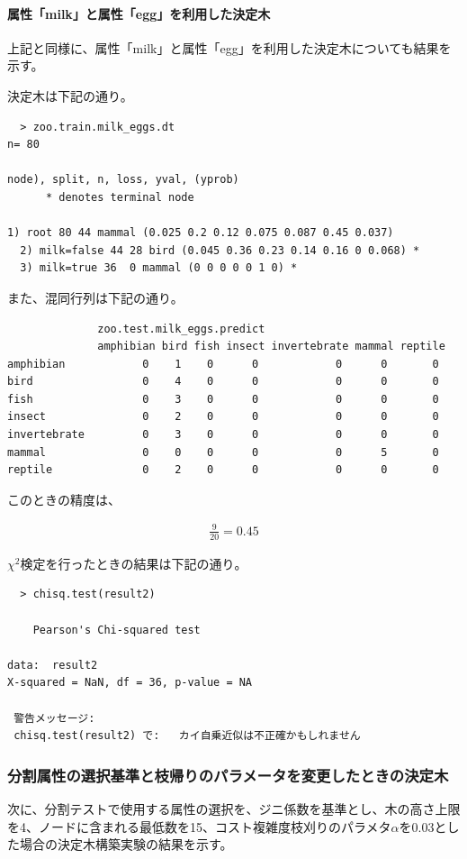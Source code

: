 \documentclass[dvipdfmx]{jsarticle}
\begin{document}
\paragraph{属性「milk」と属性「egg」を利用した決定木}\par
上記と同様に、属性「milk」と属性「egg」を利用した決定木についても結果を示す。\par
決定木は下記の通り。
\begin{verbatim}
  > zoo.train.milk_eggs.dt
n= 80

node), split, n, loss, yval, (yprob)
      * denotes terminal node

1) root 80 44 mammal (0.025 0.2 0.12 0.075 0.087 0.45 0.037)
  2) milk=false 44 28 bird (0.045 0.36 0.23 0.14 0.16 0 0.068) *
  3) milk=true 36  0 mammal (0 0 0 0 0 1 0) *
\end{verbatim}
また、混同行列は下記の通り。
\begin{verbatim}
              zoo.test.milk_eggs.predict
              amphibian bird fish insect invertebrate mammal reptile
amphibian            0    1    0      0            0      0       0
bird                 0    4    0      0            0      0       0
fish                 0    3    0      0            0      0       0
insect               0    2    0      0            0      0       0
invertebrate         0    3    0      0            0      0       0
mammal               0    0    0      0            0      5       0
reptile              0    2    0      0            0      0       0

\end{verbatim}
このときの精度は、
\begin{center}
  \begin{align*}
    \frac{9}{20} = 0.45
  \end{align*}
\end{center}
$χ^{2}検定を行ったときの結果は下記の通り。$
\begin{verbatim}
  > chisq.test(result2)

	Pearson's Chi-squared test

data:  result2
X-squared = NaN, df = 36, p-value = NA

 警告メッセージ:
 chisq.test(result2) で:   カイ自乗近似は不正確かもしれません
\end{verbatim}
\subsubsection{分割属性の選択基準と枝帰りのパラメータを変更したときの決定木}
次に、分割テストで使用する属性の選択を、ジニ係数を基準とし、木の高さ上限を4、ノードに含まれる最低数を15、コスト複雑度枝刈りのパラメタ$\alpha$を0.03とした場合の決定木構築実験の結果を示す。
\end{document}
